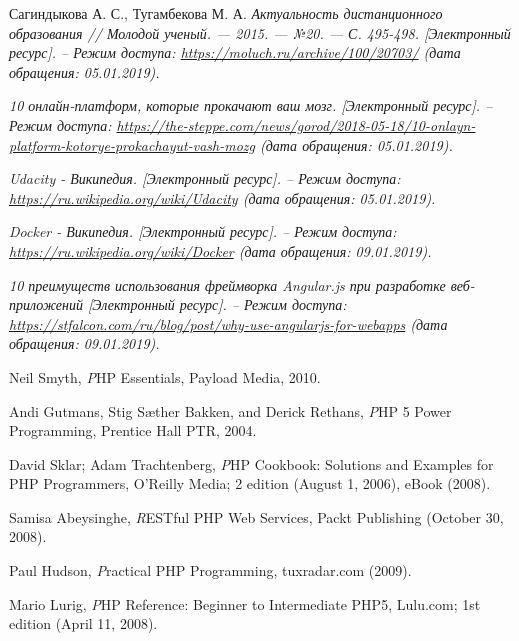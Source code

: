 \begin{thebibliography}{}

Сагиндыкова А. С., Тугамбекова М. А.
\emph{Актуальность дистанционного образования // Молодой ученый. — 2015. — №20. — С. 495-498.
[Электронный ресурс]. – Режим доступа:
\href{https://moluch.ru/archive/100/20703/}{https://moluch.ru/archive/100/20703/}
(дата обращения: 05.01.2019).}

\emph{10 онлайн-платформ, которые прокачают ваш мозг.
[Электронный ресурс]. – Режим доступа:
\href{https://the-steppe.com/news/gorod/2018-05-18/10-onlayn-platform-kotorye-prokachayut-vash-mozg}{https://the-steppe.com/news/gorod/2018-05-18/10-onlayn-platform-kotorye-prokachayut-vash-mozg}
(дата обращения: 05.01.2019).}

\emph{Udacity - Википедия. [Электронный ресурс]. – Режим доступа:
\href{https://ru.wikipedia.org/wiki/Udacity}{https://ru.wikipedia.org/wiki/Udacity}
(дата обращения: 05.01.2019).}

\emph{Docker - Википедия. [Электронный ресурс]. – Режим доступа:
\href{https://ru.wikipedia.org/wiki/Docker}{https://ru.wikipedia.org/wiki/Docker}
(дата обращения: 09.01.2019).}

\emph{10 преимуществ использования фреймворка Angular.js при разработке веб-приложений [Электронный ресурс]. – Режим доступа:
\href{https://stfalcon.com/ru/blog/post/why-use-angularjs-for-webapps}{https://stfalcon.com/ru/blog/post/why-use-angularjs-for-webapps}
(дата обращения: 09.01.2019).}







\bibitem{}
Neil Smyth,
\emph PHP Essentials,
Payload Media,
2010.

\bibitem{}
  Andi Gutmans, Stig Sæther Bakken, and Derick Rethans,
  \emph PHP 5 Power Programming,
  Prentice Hall PTR,
  2004.

\bibitem{}
  David Sklar; Adam Trachtenberg,
  \emph PHP Cookbook: Solutions and Examples for PHP Programmers,
  O'Reilly Media; 2 edition (August 1, 2006), eBook (2008).

\bibitem{}
  Samisa Abeysinghe,
  \emph RESTful PHP Web Services,
  Packt Publishing (October 30, 2008).

\bibitem{}
  Paul Hudson,
  \emph Practical PHP Programming,
  tuxradar.com (2009).

\bibitem{}
  Mario Lurig,
  \emph PHP Reference: Beginner to Intermediate PHP5,
  Lulu.com; 1st edition (April 11, 2008).


\end{thebibliography}

